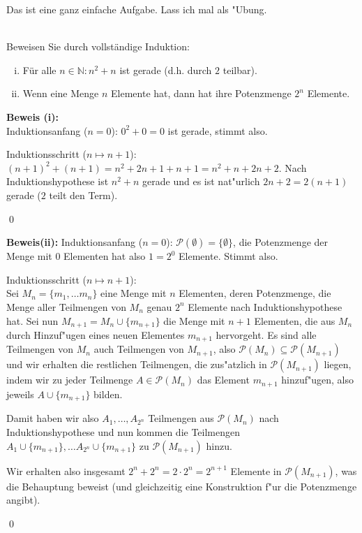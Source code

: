 \begin{loesung}
Das ist eine ganz einfache Aufgabe. Lass ich mal als "Ubung.
\end{loesung}

\\
Beweisen Sie durch vollständige Induktion:
\begin{enumerate}[(i)]
  \item Für alle $n\in\mathbb{N}:n^2+n$ ist gerade (d.h. durch $2$ teilbar).
  \item Wenn eine Menge $n$ Elemente hat, dann hat ihre Potenzmenge $2^n$ Elemente.
\end{enumerate}

\begin{loesung}
\textbf{Beweis (i):}\\
Induktionsanfang ($n=0$): $0^2+0=0$ ist gerade, stimmt also.

Induktionsschritt ($n\mapsto n+1$):\\
$(n+1)^2+(n+1)=n^2+2n+1+n+1=n^2+n+2n+2$. Nach Induktionshypothese ist $n^2+n$ gerade und es ist nat"urlich $2n+2=2(n+1)$ gerade ($2$ teilt den Term).

\qed

\textbf{Beweis(ii):}
Induktionsanfang ($n=0$): $\mathscr{P}(\emptyset)=\{\emptyset\}$, die Potenzmenge der Menge mit $0$ Elementen hat also $1=2^0$ Elemente. Stimmt also.

Induktionsschritt ($n\mapsto n+1$):\\
Sei $M_n=\{m_1,\hdots m_n\}$ eine Menge mit $n$ Elementen, deren Potenzmenge, die Menge aller Teilmengen von $M_n$ genau $2^n$ Elemente nach Induktionshypothese hat.
Sei nun $M_{n+1}=M_n\cup \{m_{n+1}\}$ die Menge mit $n+1$ Elementen, die aus $M_n$ durch Hinzuf"ugen eines neuen Elementes $m_{n+1}$ hervorgeht.
Es sind alle Teilmengen von $M_n$ auch Teilmengen von $M_{n+1}$, also $\mathscr{P}(M_n)\subseteq\mathscr{P}(M_{n+1})$ und wir erhalten die restlichen Teilmengen, die zus"atzlich in
$\mathscr{P}(M_{n+1})$ liegen, indem wir zu jeder Teilmenge $A\in\mathscr{P}(M_n)$ das Element $m_{n+1}$ hinzuf"ugen, also jeweils $A\cup \{m_{n+1}\}$ bilden.

Damit haben wir also $A_1,\hdots,A_{2^n}$ Teilmengen aus $\mathscr{P}(M_n)$ nach Induktionshypothese und nun kommen die Teilmengen $A_1\cup\{m_{n+1}\},\hdots A_{2^n}\cup\{m_{n+1}\}$ zu $\mathscr{P}(M_{n+1})$ hinzu.

Wir erhalten also insgesamt $2^n+2^n=2\cdot 2^n=2^{n+1}$ Elemente in $\mathscr{P}(M_{n+1})$, was die Behauptung beweist (und gleichzeitig eine Konstruktion f"ur die Potenzmenge angibt).

\qed
\end{loesung}
